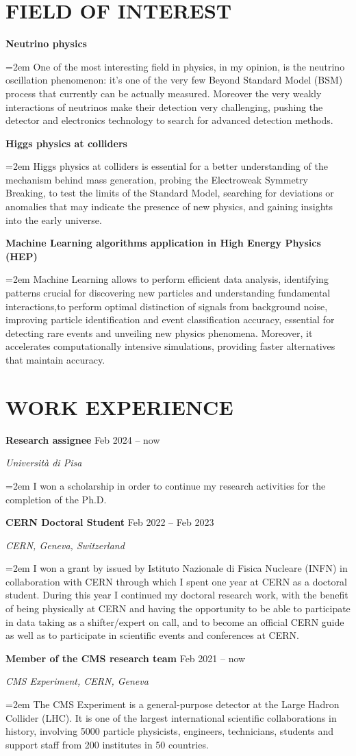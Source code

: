 \documentclass[fontsize=12pt]{article} %
\newcommand{\sepspace}{\vspace*{1em}}		%
\newcommand{\sepspacesmall}{\vspace*{0.3em}}
\newcommand{\NewPart}[1]{\section*{\uppercase{#1}}}
\newcommand{\EducationEntry}[4]{
	\noindent \textbf{#1} \hfill      %
	{#2} \par  %
	\noindent \textit{#3} \par        %
	\noindent\hangindent=2em\hangafter=0 \small #4 %
	\normalsize \par}
\begin{document}
    \sepspace
    \NewPart{Field of interest}
    \EducationEntry{Neutrino physics}{}{}{One of the most interesting field in physics, in my opinion, is the neutrino oscillation phenomenon: it's one of the very few Beyond Standard Model (BSM) process that currently can be actually measured. Moreover the very weakly interactions of neutrinos make their detection very challenging, pushing the detector and electronics technology to search for advanced detection methods.}
    \sepspacesmall
	\EducationEntry{Higgs physics at colliders}{}{}{Higgs physics at colliders is essential for a better understanding of the mechanism behind mass generation, probing the Electroweak Symmetry Breaking, to test the limits of the Standard Model, searching for deviations or anomalies that may indicate the presence of new physics, and gaining insights into the early universe.}
	\sepspacesmall
	\EducationEntry{Machine Learning algorithms application in High Energy Physics (HEP)}{}{}{Machine Learning allows to perform efficient data analysis, identifying patterns crucial for discovering new particles and understanding fundamental interactions,to perform optimal distinction of signals from background noise, improving particle identification and event classification accuracy, essential for detecting rare events and unveiling new physics phenomena. Moreover, it accelerates computationally intensive simulations, providing faster alternatives that maintain accuracy.}
	\sepspacesmall
    \NewPart{Work Experience}
	\EducationEntry{Research assignee}{Feb 2024 {--} now}{Università di Pisa}{I won a scholarship in order to continue my research activities for the completion of the Ph.D.}
	\sepspace
	\EducationEntry{CERN Doctoral Student}{Feb 2022 {--} Feb 2023}{CERN, Geneva, Switzerland}{I won a grant by  issued by Istituto Nazionale di Fisica Nucleare (INFN) in collaboration with CERN through which I spent one year at CERN as a doctoral student. During this year I continued my doctoral research work, with the benefit of being physically at CERN and having the opportunity to be able to participate in data taking as a shifter/expert on call, and to become an official CERN guide as well as to participate in scientific events and conferences at CERN.}
	\sepspace
	\EducationEntry{Member of the CMS research team}{Feb 2021 {--} now}{CMS Experiment, CERN, Geneva}{The CMS Experiment is a general-purpose detector at the Large Hadron Collider (LHC). It is one of the largest international scientific collaborations in history, involving 5000 particle physicists, engineers, technicians, students and support staff from 200 institutes in 50 countries.}
\end{document}

